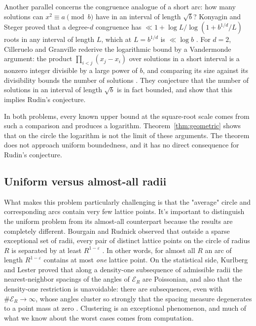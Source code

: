 \documentclass[11pt]{article}
\newcommand{\E}{\mathcal E}
\begin{document}
Another parallel concerns the congruence analogue of a short arc: how many solutions can \(x^2\equiv a\pmod b\) have in an interval of length \(\sqrt b\)?
Konyagin and Steger proved that a degree-\(d\) congruence has \(\ll 1+\log L/\log(1+b^{1/d}/L)\) roots in any interval of length \(L\), which at \(L=b^{1/d}\) is \(\ll\log b\) \cite{KonyaginSteger1994}.
For \(d=2\), Cilleruelo and Granville rederive the logarithmic bound by a Vandermonde argument: the product \(\prod_{i<j}(x_j-x_i)\) over solutions in a short interval is a nonzero integer divisible by a large power of \(b\), and comparing its size against its divisibility bounds the number of solutions \cite{CillerueloGranville2007}.
They conjecture that the number of solutions in an interval of length \(\sqrt b\) is in fact bounded, and show that this implies Rudin's conjecture.

In both problems, every known upper bound at the square-root scale comes from such a comparison and produces a logarithm.
Theorem~\ref{thm:geometric} shows that on the circle the logarithm is not the limit of these arguments.
The theorem does not approach uniform boundedness, and it has no direct consequence for Rudin's conjecture.

\subsection{Uniform versus almost-all radii}
\label{subsec:almost-all}

What makes this problem particularly challenging is that the "average" circle and corresponding arcs contain very few lattice points.
It's important to distinguish the uniform problem from its almost-all counterpart because the results are completely different.
Bourgain and Rudnick observed that outside a sparse exceptional set of radii, every pair of distinct lattice points on the circle of radius $R$ is separated by at least $R^{1-\varepsilon}$ \cite{BourgainRudnick2011}.
In other words, for almost all \(R\) an arc of length \(R^{1-\varepsilon}\) contains at most \emph{one} lattice point.
On the statistical side, Kurlberg and Lester proved that along a density-one subsequence of admissible radii the nearest-neighbor spacings of the angles of \(\E_R\) are Poissonian, and also that the density-one restriction is unavoidable: there are subsequences, even with \(\#\E_R\to\infty\), whose angles cluster so strongly that the spacing measure degenerates to a point mass at zero \cite{KurlbergLester2025}.
Clustering is an exceptional phenomenon, and much of what we know about the worst cases comes from computation.
\end{document}
